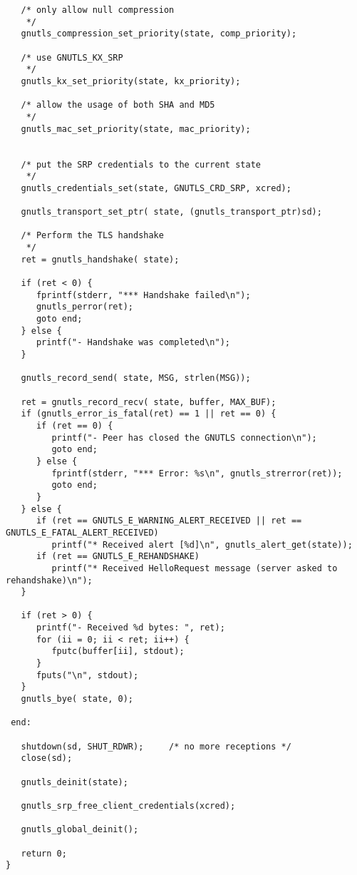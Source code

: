 \begin{verbatim}
   /* only allow null compression
    */
   gnutls_compression_set_priority(state, comp_priority);
 
   /* use GNUTLS_KX_SRP
    */
   gnutls_kx_set_priority(state, kx_priority);
 
   /* allow the usage of both SHA and MD5
    */
   gnutls_mac_set_priority(state, mac_priority);


   /* put the SRP credentials to the current state
    */
   gnutls_credentials_set(state, GNUTLS_CRD_SRP, xcred);

   gnutls_transport_set_ptr( state, (gnutls_transport_ptr)sd);

   /* Perform the TLS handshake
    */
   ret = gnutls_handshake( state);

   if (ret < 0) {
      fprintf(stderr, "*** Handshake failed\n");
      gnutls_perror(ret);
      goto end;
   } else {
      printf("- Handshake was completed\n");
   }

   gnutls_record_send( state, MSG, strlen(MSG));

   ret = gnutls_record_recv( state, buffer, MAX_BUF);
   if (gnutls_error_is_fatal(ret) == 1 || ret == 0) {
      if (ret == 0) {
         printf("- Peer has closed the GNUTLS connection\n");
         goto end;
      } else {
         fprintf(stderr, "*** Error: %s\n", gnutls_strerror(ret));
         goto end;
      }
   } else {
      if (ret == GNUTLS_E_WARNING_ALERT_RECEIVED || ret == GNUTLS_E_FATAL_ALERT_RECEIVED)
         printf("* Received alert [%d]\n", gnutls_alert_get(state));
      if (ret == GNUTLS_E_REHANDSHAKE)
         printf("* Received HelloRequest message (server asked to rehandshake)\n");
   }

   if (ret > 0) {
      printf("- Received %d bytes: ", ret);
      for (ii = 0; ii < ret; ii++) {
         fputc(buffer[ii], stdout);
      }
      fputs("\n", stdout);
   }
   gnutls_bye( state, 0);

 end:

   shutdown(sd, SHUT_RDWR);     /* no more receptions */
   close(sd);

   gnutls_deinit(state);

   gnutls_srp_free_client_credentials(xcred);

   gnutls_global_deinit();

   return 0;
}

\end{verbatim}
